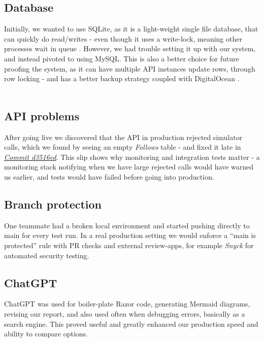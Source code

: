 \subsection{Database}
Initially, we wanted to use SQLite, as it is a light-weight single file database, that can quickly do read/writes - even though it uses a write-lock, meaning other processes wait in queue \cite{sqlite}. However, we had trouble setting it up with our system, and instead pivoted to using MySQL. This is also a better choice for future proofing the system, as it can have multiple API instances update rows, through row locking - and has a better backup strategy coupled with DigitalOcean \cite{mysql}.
\\\\
\subsection{API problems}
After going live we discovered that the API in production rejected simulator calls, which we found by seeing an empty \textit{Follows} table - and fixed it late in \textit{\href{https://github.com/Lukski175/MiniTwit-FS/commit/d3516edf5bb13276301662131f545ecd64904e19}{Commit d3516ed}}. This slip shows why monitoring and integration tests matter - a monitoring stack notifying when we have large rejected calls would have warned us earlier, and tests would have failed before going into production.
\\
\subsection{Branch protection}
One teammate had a broken local environment and started pushing directly to main for every test run. In a real production setting we would enforce a “main is protected” rule with PR checks and external review-apps, for example \textit{Snyck} for automated security testing.

\subsection{ChatGPT}
ChatGPT was used for boiler-plate Razor code, generating Mermaid diagrams, revising our report, and also used often when debugging errors, basically as a search engine. This proved useful and greatly enhanced our production speed and ability to compare options.